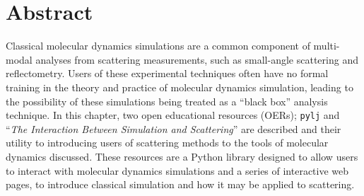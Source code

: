 \section*{Abstract}
Classical molecular dynamics simulations are a common component of multi-modal analyses from scattering measurements, such as small-angle scattering and reflectometry.
Users of these experimental techniques often have no formal training in the theory and practice of molecular dynamics simulation, leading to the possibility of these simulations being treated as a ``black box'' analysis technique.
In this chapter, two open educational resources (OERs); \texttt{pylj} and ``\emph{The Interaction Between Simulation and Scattering}'' are described and their utility to introducing users of scattering methods to the tools of molecular dynamics discussed.
These resources are a Python library designed to allow users to interact with molecular dynamics simulations and a series of interactive web pages, to introduce classical simulation and how it may be applied to scattering.
